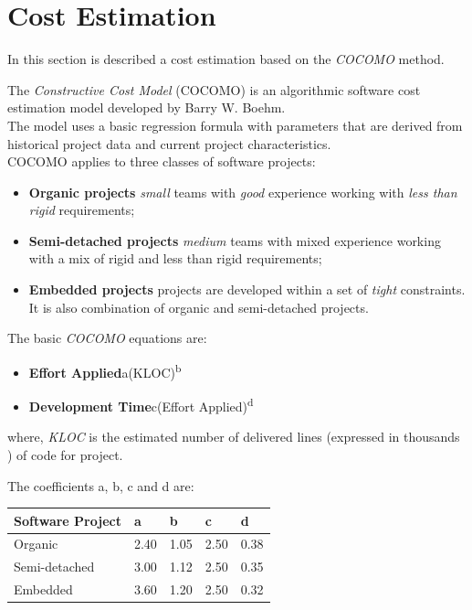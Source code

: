 \section{Cost Estimation}
In this section is described a cost estimation based on the \textit{COCOMO} method.

The \textit{Constructive Cost Model} (COCOMO) is an algorithmic software cost estimation model developed by Barry W. Boehm.\\
The model uses a basic regression formula with parameters that are derived from historical project data and current project characteristics.\\

COCOMO applies to three classes of software projects:
\begin{itemize}
    \item \textbf{Organic projects} \textit{small} teams with \textit{good} experience working with \textit{less than rigid} requirements;
    \item \textbf{Semi-detached projects} \textit{medium} teams with mixed experience working with a mix of rigid and less than rigid requirements;
    \item \textbf{Embedded projects} projects are developed within a set of \textit{tight} constraints. It is also combination of organic and semi-detached projects.
\end{itemize}

The basic \textit{COCOMO} equations are:
\begin{itemize}
    \item \textbf{Effort Applied}\quad a(KLOC)\textsuperscript{b}
    \item \textbf{Development Time}\quad c(Effort Applied)\textsuperscript{d}
\end{itemize}

where, \textit{KLOC} is the estimated number of delivered lines (expressed in thousands ) of code for project.\\
\clearpage

The coefficients a, b, c and d are:
\begin{table}[H]
\begin{tabular}{| p{} | p{} | p{} | p{} | p{} |}
  \hline
  \textbf{Software Project} & \textbf{a} & \textbf{b} & \textbf{c} & \textbf{d}\\ \hline
  Organic       & 2.40 & 1.05 & 2.50 & 0.38 \\ \hline
  Semi-detached & 3.00 & 1.12 & 2.50 & 0.35 \\ \hline
  Embedded      & 3.60 & 1.20 & 2.50 & 0.32 \\ \hline
\end{tabular}
\end{table}

